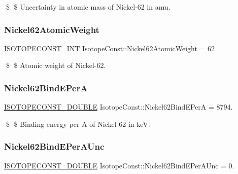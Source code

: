 \$ \$ Uncertainty in atomic mass of Nickel-\/62 in amu. \mbox{\label{group___isotope_const-_nickel-_ni62_gaf43fb9794e2c821edb2ffc7c5a384c31}} 
\subsubsection{\texorpdfstring{Nickel62\+Atomic\+Weight}{Nickel62AtomicWeight}}
{\footnotesize\ttfamily \mbox{\hyperlink{group___isotope_const-_macros_ga5f18360b3e99483a35c32d789e62621c}{I\+S\+O\+T\+O\+P\+E\+C\+O\+N\+S\+T\+\_\+\+I\+NT}} Isotope\+Const\+::\+Nickel62\+Atomic\+Weight = 62}

\$ \$ Atomic weight of Nickel-\/62. \mbox{\label{group___isotope_const-_nickel-_ni62_ga62ca9803073ca70a91dba11899b3db35}} 
\subsubsection{\texorpdfstring{Nickel62\+Bind\+E\+PerA}{Nickel62BindEPerA}}
{\footnotesize\ttfamily \mbox{\hyperlink{group___isotope_const-_macros_ga8f45a7272ce02c0b4c65c44636ed719a}{I\+S\+O\+T\+O\+P\+E\+C\+O\+N\+S\+T\+\_\+\+D\+O\+U\+B\+LE}} Isotope\+Const\+::\+Nickel62\+Bind\+E\+PerA = 8794.}

\$ \$ Binding energy per A of Nickel-\/62 in keV. \mbox{\label{group___isotope_const-_nickel-_ni62_gaefac0a5348e9b8e2a86d61e1aca60b0c}} 
\subsubsection{\texorpdfstring{Nickel62\+Bind\+E\+Per\+A\+Unc}{Nickel62BindEPerAUnc}}
{\footnotesize\ttfamily \mbox{\hyperlink{group___isotope_const-_macros_ga8f45a7272ce02c0b4c65c44636ed719a}{I\+S\+O\+T\+O\+P\+E\+C\+O\+N\+S\+T\+\_\+\+D\+O\+U\+B\+LE}} Isotope\+Const\+::\+Nickel62\+Bind\+E\+Per\+A\+Unc = 0.}


